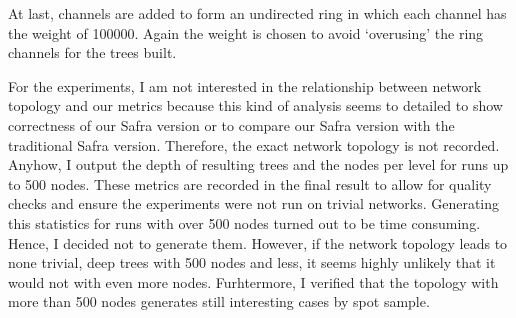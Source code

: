   At last, channels are added to form an undirected ring in which each channel has the weight of 100000. 
  Again the weight is chosen to avoid `overusing' the ring channels for the trees built.
  
  For the experiments, I am not interested in the relationship between network topology and our metrics because this kind of analysis seems to detailed to show correctness of our Safra version or to compare
  our Safra version with the traditional Safra version.
  Therefore, the exact network topology is not recorded. 
  Anyhow, I output the depth of resulting trees and the nodes per level for runs up to 500 nodes.
  These metrics are recorded in the final result to allow for quality checks and ensure the experiments were not run on trivial networks.
  Generating this statistics for runs with over 500 nodes turned out to be time consuming.
  Hence, I decided not to generate them.
  However, if the network topology leads to none trivial, deep trees with 500 nodes and less, it seems highly unlikely that it would not with even more nodes.
  Furhtermore, I verified that the topology with more than 500 nodes generates still interesting cases by spot sample.
  